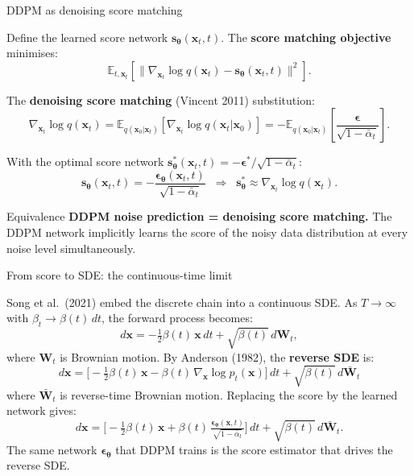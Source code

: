 \documentclass[aspectratio=169,11pt]{beamer}
\newcommand{\E}{\mathbb{E}}
\newcommand{\bx}{\bm{x}}
\newcommand{\beps}{\bm{\epsilon}}
\newcommand{\btheta}{\bm{\theta}}
\begin{document}
\begin{frame}{DDPM as denoising score matching}

Define the learned score network $\bm{s}_{\btheta}(\bx_t,t)$.
The \textbf{score matching objective} minimises:
\[
  \E_{t,\bx_t}\!\left[\bigl\|\nabla_{\bx_t}\log q(\bx_t) - \bm{s}_{\btheta}(\bx_t,t)\bigr\|^2\right].
\]

The \textbf{denoising score matching} (Vincent 2011) substitution:
\[
  \nabla_{\bx_t}\log q(\bx_t)
  = \E_{q(\bx_0|\bx_t)}\!\left[\nabla_{\bx_t}\log q(\bx_t|\bx_0)\right]
  = -\E_{q(\bx_0|\bx_t)}\!\left[\frac{\beps}{\sqrt{1-\bar\alpha_t}}\right].
\]

With the optimal score network $\bm{s}^*_{\btheta}(\bx_t,t)=-\beps^*/\sqrt{1-\bar\alpha_t}$:
\[
  \bm{s}_{\btheta}(\bx_t,t)
  = -\frac{\beps_{\btheta}(\bx_t,t)}{\sqrt{1-\bar\alpha_t}}
  \;\;\Longrightarrow\;\;
  \bm{s}^*_{\btheta}\approx\nabla_{\bx_t}\log q(\bx_t).
\]

\begin{alertblock}{Equivalence}
\textbf{DDPM noise prediction = denoising score matching.}
The DDPM network implicitly learns the score of the noisy data distribution
at every noise level simultaneously.
\end{alertblock}
\end{frame}

\begin{frame}{From score to SDE: the continuous-time limit}

Song et al.\ (2021) embed the discrete chain into a continuous SDE.
As $T\to\infty$ with $\beta_t\to\beta(t)\,dt$, the forward process becomes:
\[
  d\bx = -\tfrac{1}{2}\beta(t)\,\bx\,dt + \sqrt{\beta(t)}\,d\bm{W}_t,
\]
where $\bm{W}_t$ is Brownian motion.  By Anderson (1982), the
\textbf{reverse SDE} is:
\[
  d\bx = \bigl[-\tfrac{1}{2}\beta(t)\,\bx
               - \beta(t)\,\nabla_{\bx}\log p_t(\bx)\bigr]\,dt
         + \sqrt{\beta(t)}\,d\bar{\bm{W}}_t
\]
where $\bar{\bm{W}}_t$ is reverse-time Brownian motion.
Replacing the score by the learned network gives:
\[
d\bx = \bigl[-\tfrac{1}{2}\beta(t)\,\bx
             + \beta(t)\,\tfrac{\beps_{\btheta}(\bx,t)}{\sqrt{1-\bar\alpha_t}}\bigr]\,dt
       + \sqrt{\beta(t)}\,d\bar{\bm{W}}_t.
\]
The same network $\beps_{\btheta}$ that DDPM trains is the score estimator
that drives the reverse SDE.
\end{frame}
\end{document}
